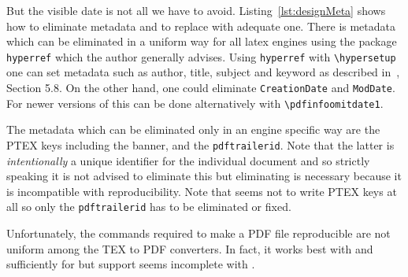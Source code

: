 But the visible date is not all we have to avoid. 
Listing~\ref{lst:designMeta} shows how to eliminate metadata 
and to replace with adequate one. 
There is metadata which can be eliminated in a uniform way for all latex engines 
using the package \texttt{hyperref} which the author generally advises. 
Using \texttt{hyperref} with \texttt{\textbackslash hypersetup} 
one can set metadata such as author, title, subject and keyword 
as described in~\cite{HyperTextP}, Section 5.8. 
On the other hand, 
one could eliminate \texttt{CreationDate} and \texttt{ModDate}. 
For newer versions of \pdflatex{} this can be done alternatively 
with \texttt{\textbackslash pdfinfoomitdate1}. 

The metadata which can be eliminated only in an engine specific way 
are the PTEX keys including the banner, and the \texttt{pdftrailerid}. 
Note that the latter is \emph{intentionally} 
a unique identifier for the individual document 
and so strictly speaking it is not advised to eliminate this 
but eliminating is necessary because it is incompatible with reproducibility. 
Note that \xelatex{} seems not to write PTEX keys at all 
so only the \texttt{pdftrailerid} has to be eliminated or fixed. 

Unfortunately, the commands required to make a PDF file reproducible 
are not uniform among the TEX to PDF converters. 
In fact, it works best with \lualatex{} and sufficiently for \pdflatex{} 
but support seems incomplete with \xelatex. 


